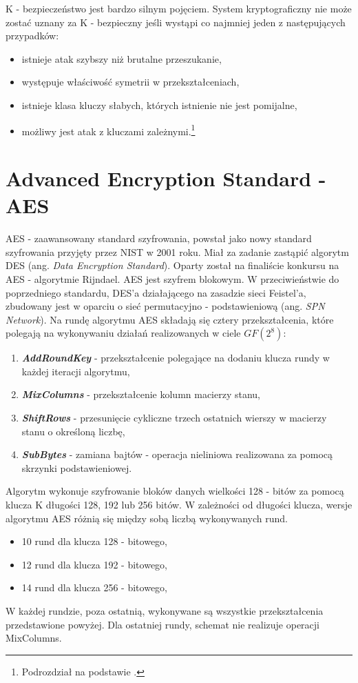 K - bezpieczeństwo jest bardzo silnym pojęciem. System kryptograficzny nie może zostać uznany za K - bezpieczny jeśli wystąpi co najmniej jeden z następujących przypadków:
\begin{itemize}
    \item istnieje atak szybszy niż brutalne przeszukanie,
    \item występuje właściwość symetrii w przekształceniach,
    \item istnieje klasa kluczy słabych, których istnienie nie jest pomijalne,
    \item możliwy jest atak z kluczami zależnymi.\footnote{Podrozdział na podstawie \cite{anubis_dokumentacja}.}
\end{itemize}



\section{Advanced Encryption Standard - AES}

AES - zaawansowany standard szyfrowania, powstał jako nowy standard szyfrowania przyjęty przez NIST w 2001 roku. Miał za zadanie zastąpić algorytm DES (ang. \textit{Data Encryption Standard}). Oparty został na finaliście konkursu na AES - algorytmie Rijndael. AES jest szyfrem blokowym. W przeciwieństwie do poprzedniego standardu, DES'a działającego na zasadzie sieci Feistel'a, zbudowany jest w oparciu o sieć permutacyjno - podstawieniową (ang. \textit{SPN Network}). Na rundę algorytmu AES składają się cztery przekształcenia, które polegają na wykonywaniu działań realizowanych w ciele $GF(2^8)$:
\begin{enumerate}
	\item \textbf{\textit{AddRoundKey}} - przekształcenie polegające na dodaniu klucza rundy w każdej iteracji algorytmu,
	\item \textbf{\textit{MixColumns}} - przekształcenie kolumn macierzy stanu,
	\item \textbf{\textit{ShiftRows}} - przesunięcie cykliczne trzech ostatnich wierszy w macierzy stanu o określoną liczbę,
	\item \textbf{\textit{SubBytes}} - zamiana bajtów - operacja nieliniowa realizowana za pomocą skrzynki podstawieniowej.
\end{enumerate}

Algorytm wykonuje szyfrowanie bloków danych wielkości 128 - bitów za pomocą klucza K długości 128, 192 lub 256 bitów. W zależności od długości klucza, wersje algorytmu AES różnią się między sobą liczbą wykonywanych rund. 
\begin{itemize}
    \item 10 rund dla klucza 128 - bitowego,
    \item 12 rund dla klucza 192 - bitowego,
    \item 14 rund dla klucza 256 - bitowego,
\end{itemize}
W każdej rundzie, poza ostatnią, wykonywane są wszystkie przekształcenia przedstawione powyżej. Dla ostatniej rundy, schemat nie realizuje operacji MixColumns.

